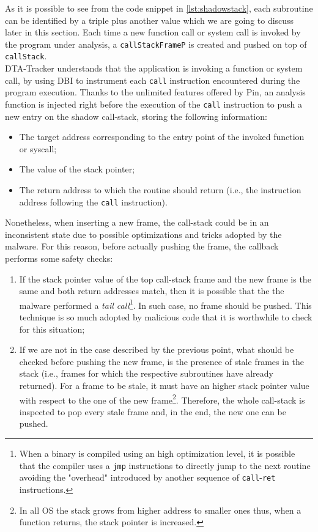 \documentclass[LaM,binding=0.6cm]{sapthesis}
\begin{document}
As it is possible to see from the code snippet in \ref{lst:shadowstack}, each subroutine can be identified by a triple plus another value which we are going to discuss later in this section. Each time a new function call or system call is invoked by the program under analysis, a \texttt{callStackFrameP} is created and pushed on top of \texttt{callStack}.\\
DTA-Tracker understands that the application is invoking a function or system call, by using DBI to instrument each \texttt{call} instruction encountered during the program execution. Thanks to the unlimited features offered by Pin, an analysis function is injected right before the execution of the \texttt{call} instruction to push a new entry on the shadow call-stack, storing the following information:
\begin{itemize}
\item The target address corresponding to the entry point of the invoked function or syscall;
\item The value of the stack pointer;
\item The return address to which the routine should return (i.e., the instruction address following the \texttt{call} instruction).
\end{itemize} 
Nonetheless, when inserting a new frame, the call-stack could be in an inconsistent state due to possible optimizations and tricks adopted by the malware. For this reason, before actually pushing the frame, the callback performs some safety checks:
\begin{enumerate}
\item If the stack pointer value of the top call-stack frame and the new frame is the same and both return addresses match, then it is possible that the the malware performed a \textit{tail call}\footnote{When a binary is compiled using an high optimization level, it is possible that the compiler uses a \texttt{jmp} instructions to directly jump to the next routine avoiding the "overhead" introduced by another sequence of \texttt{call}-\texttt{ret} instructions.}. In such case, no frame should be pushed. This technique is so much adopted by malicious code that it is worthwhile to check for this situation;
\item If we are not in the case described by the previous point, what should be checked before pushing the new frame, is the presence of stale frames in the stack (i.e., frames for which the respective subroutines have already returned). For a frame to be stale, it must have an higher stack pointer value with respect to the one of the new frame\footnote{In all OS the stack grows from higher address to smaller ones thus, when a function returns, the stack pointer is increased.}. Therefore, the whole call-stack is inspected to pop every stale frame and, in the end, the new one can be pushed.  
\end{enumerate}
\end{document}
